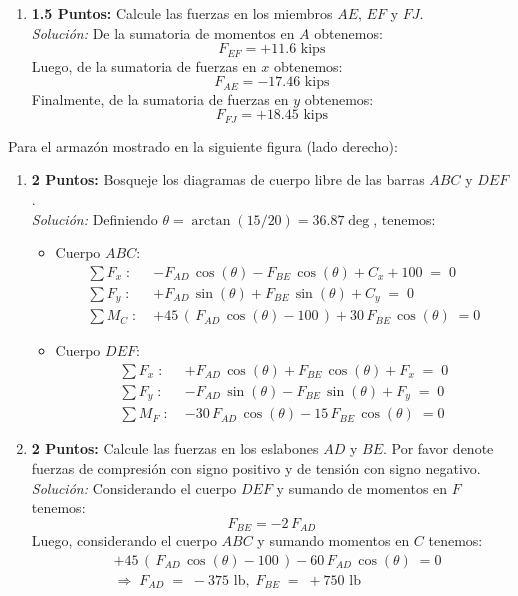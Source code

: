 \documentclass[ a4paper, twoside, 11pt]{article}
\begin{document}
\begin{problem}
\begin{enumerate}[label=\textbf{\alph*)}]
\item \textbf{1.5 Puntos:} Calcule las fuerzas en los miembros $AE$, $EF$ y $FJ$. \\[1ex] \emph{Soluci\'on:} De la sumatoria de momentos en $A$ obtenemos:
\[
F_{EF} = +11.6 \text{ kips}
\]
Luego, de la sumatoria de fuerzas en $x$ obtenemos: 
\[
F_{AE} = -17.46 \text{ kips}
\]
Finalmente, de la sumatoria de fuerzas en $y$ obtenemos: 
\[
F_{FJ} = +18.45 \text{ kips}
\]

\end{enumerate}

\end{problem}
\fullskip

\begin{problem}
Para el armaz\'on mostrado en la siguiente figura (lado derecho):
\begin{enumerate}[label=\textbf{\alph*)}]
\item \textbf{2 Puntos:} Bosqueje los diagramas de cuerpo libre de las barras $ABC$ y $DEF$. \\[1ex] \emph{Soluci\'on:} Definiendo $\theta = \arctan( 15 / 20 ) = 36.87\deg$, tenemos: 
\begin{itemize}
\item Cuerpo $ABC$: 
\begin{align*}
\sum F_x \; \colon \;
& -F_{AD} \, \cos(\theta) - F_{BE} \, \cos(\theta) + C_x + 100 \; = \; 0 \\[1ex]
\sum F_y \; \colon \;
& +F_{AD} \, \sin(\theta) + F_{BE} \, \sin(\theta) + C_y \; = \; 0 \\[1ex]
\sum M_C \; \colon \;
& +45 \, ( \, F_{AD} \, \cos(\theta) - 100 \, ) + 30 \, F_{BE} \, \cos(\theta) \; = 0
\end{align*}
\item Cuerpo $DEF$: 
\begin{align*}
\sum F_x \; \colon \;
& +F_{AD} \, \cos(\theta) + F_{BE} \, \cos(\theta) + F_x \; = \; 0 \\[1ex]
\sum F_y \; \colon \;
& -F_{AD} \, \sin(\theta) - F_{BE} \, \sin(\theta) + F_y \; = \; 0 \\[1ex]
\sum M_F \; \colon \;
& -30 \, F_{AD} \, \cos(\theta) - 15 \, F_{BE} \, \cos(\theta) \; = 0
\end{align*}
\end{itemize}

\item \textbf{2 Puntos:} Calcule las fuerzas en los eslabones $AD$ y $BE$. Por favor denote fuerzas de compresi\'on con signo positivo y de tensi\'on con signo negativo. \\[1ex] \emph{Soluci\'on:} Considerando el cuerpo $DEF$ y sumando de momentos en $F$ tenemos: 
\[
F_{BE} = -2 \, F_{AD}
\]
Luego, considerando el cuerpo $ABC$ y sumando momentos en $C$ tenemos: 
\begin{align*}
& +45 \, ( \, F_{AD} \, \cos(\theta) - 100 \, ) - 60 \, F_{AD} \, \cos(\theta) \; = 0 \\
& \Longrightarrow \;
F_{AD} \; = \; -375 \text{ lb}, \;
F_{BE} \; = \; +750 \text{ lb}
\end{align*}


\end{enumerate}
\end{problem}
\end{document}
